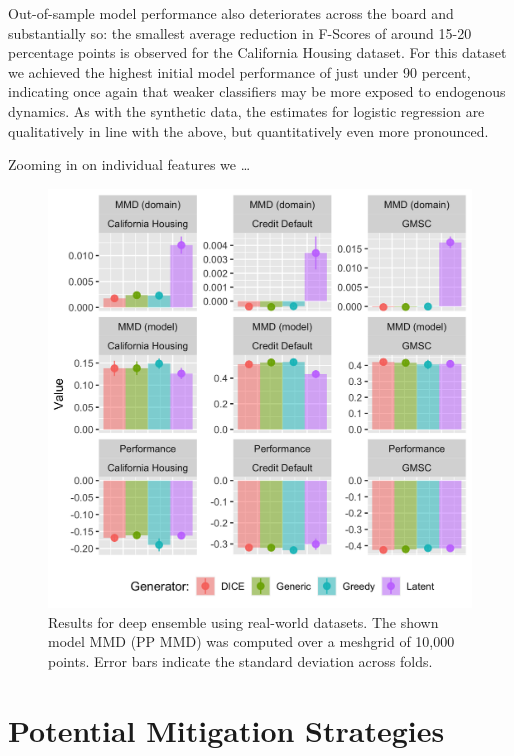 \documentclass[conference,final,]{IEEEtran}
\begin{document}
Out-of-sample model performance also deteriorates across the board and substantially so: the smallest average reduction in F-Scores of around 15-20 percentage points is observed for the California Housing dataset. For this dataset we achieved the highest initial model performance of just under 90 percent, indicating once again that weaker classifiers may be more exposed to endogenous dynamics. As with the synthetic data, the estimates for logistic regression are qualitatively in line with the above, but quantitatively even more pronounced.

Zooming in on individual features we \ldots{}

\begin{figure}

{\centering \includegraphics[width=0.9\linewidth]{www/real_world_results} 

}

\caption{Results for deep ensemble using real-world datasets. The shown model MMD (PP MMD) was computed over a meshgrid of 10,000 points. Error bars indicate the standard deviation across folds.}\label{fig:real}
\end{figure}

\hypertarget{mitigate}{%
\section{Potential Mitigation Strategies}\label{mitigate}}
\end{document}
